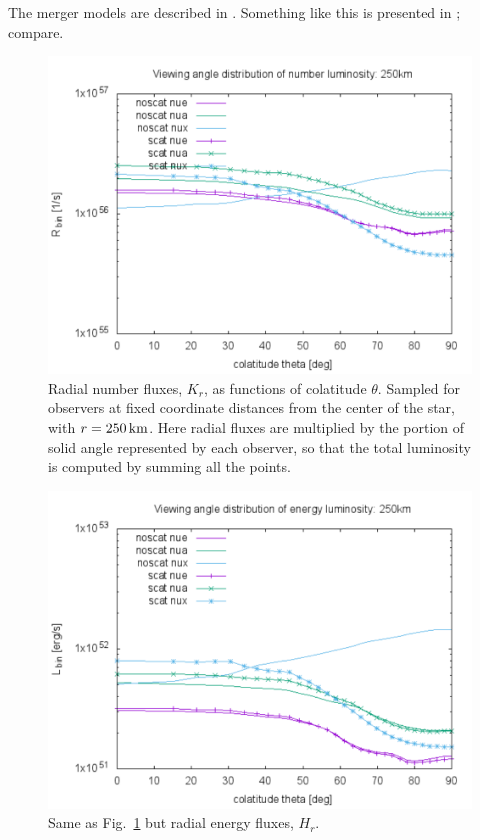 \documentclass[aps,floatfix,prd,superscriptaddress,twocolumn]{revtex4-1}
\begin{document}
The merger models are described in \cite{fouc2015-m1_nsbh, fouc2016-m1_nsns}.
Something like this is presented in \cite[Figs.~10-11]{pere2014-nu_wind};
compare.

\begin{figure}
  \includegraphics[width=\columnwidth]{theta_distrib-250km-luminosity_R}
  \caption{Radial number fluxes, $K_r$, as functions of colatitude $\theta$.
    Sampled for observers at fixed coordinate distances from the center
    of the star, with $r=250\,{\rm km}$.
    Here radial fluxes are multiplied by the portion of solid angle
    represented by each observer, so that the total luminosity is
    computed by summing all the points.}
  \label{fig:nsns_theta_distrib_R}
\end{figure}

\begin{figure}
  \includegraphics[width=\columnwidth]{theta_distrib-250km-luminosity_L}
  \caption{Same as Fig.~\ref{fig:nsns_theta_distrib_R} but radial energy
    fluxes, $H_r$.}
  \label{fig:nsns_theta_distrib_L}
\end{figure}
\end{document}
